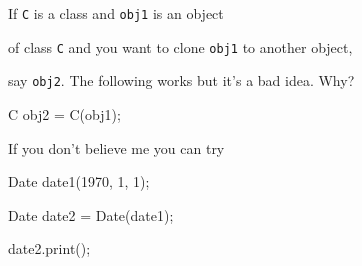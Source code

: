 If \texttt{C} is a class and \texttt{obj1} is an object

of class \texttt{C} and you want to clone \texttt{obj1} to another object,

say \texttt{obj2}. The following works but it's a bad idea. Why?



\begin{consolethree}[escapeinside=||]

C obj2 = C(obj1);

\end{consolethree}



If you don't believe me you can try



\begin{consolethree}[escapeinside=||]

Date date1(1970, 1, 1);

Date date2 = Date(date1);

date2.print();

\end{consolethree}

